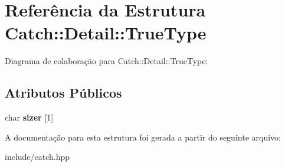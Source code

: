\hypertarget{structCatch_1_1Detail_1_1TrueType}{}\section{Referência da Estrutura Catch\+:\+:Detail\+:\+:True\+Type}
\label{structCatch_1_1Detail_1_1TrueType}


Diagrama de colaboração para Catch\+:\+:Detail\+:\+:True\+Type\+:
\subsection*{Atributos Públicos}
\begin{DoxyCompactItemize}
\item 
char {\bfseries sizer} \mbox{[}1\mbox{]}\hypertarget{structCatch_1_1Detail_1_1TrueType_a3aaaeb75909e668b293c8a81f5fb6419}{}\label{structCatch_1_1Detail_1_1TrueType_a3aaaeb75909e668b293c8a81f5fb6419}

\end{DoxyCompactItemize}


A documentação para esta estrutura foi gerada a partir do seguinte arquivo\+:\begin{DoxyCompactItemize}
\item 
include/catch.\+hpp\end{DoxyCompactItemize}
